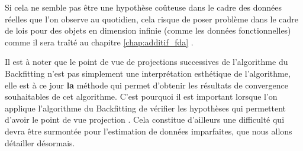 {{        \smallskip

        Si cela ne semble pas être une hypothèse coûteuse dans le cadre des données réelles que l'on observe au quotidien, cela risque de poser problème dans le cadre de lois pour des objets en dimension infinie (comme les données fonctionnelles) comme il sera traîté au chapitre \ref{chap:additif_fda} \og{}\fg. 
    }

    Il est à noter que le point de vue de \og projections successives \fg de l'algorithme du Backfitting n'est pas simplement une interprétation esthétique de l'algorithme, elle est à ce jour \textbf{la} méthode qui permet d'obtenir les résultats de convergence souhaitables de cet algorithme. C'est pourquoi il est important lorsque l'on applique l'algorithme du Backfitting de vérifier les hypothèses qui permettent d'avoir le point de vue \og projection \fg. Cela constitue d'ailleurs une difficulté qui devra être surmontée pour l'estimation de données imparfaites, que nous allons détailler désormais.
    
}